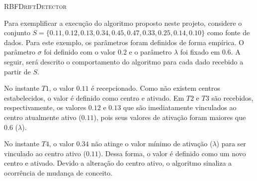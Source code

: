 \documentclass[qual, classic, a4paper]{ufbathesis}
\begin{document}
\vspace{7pt}
\begin{algorithm}[H]
    \SetAlgoLined

    \caption{\textsc{RBFDriftDetector}}
    \label{alg:algoritmo} 
\end{algorithm}
\vspace{7pt}

Para exemplificar a execução do algoritmo proposto neste projeto, considere o conjunto $S = \{0.11, 0.12, 0.13, 0.34, 0.45, 0.47, 0.33, 0.25, 0.14, 0.10\}$ como fonte de dados.
Para este exemplo, os parâmetros foram definidos de forma empírica. O parâmetro \textit{$\sigma$} foi definido com o valor $0.2$ e o parâmetro \textit{$\lambda$} foi fixado em $0.6$.
A seguir, será descrito o comportamento do algoritmo para cada dado recebido a partir de $S$.

No instante $T1$, o valor $0.11$ é recepcionado. Como não existem centros estabelecidos, o valor é definido como centro e ativado.
Em $T2$ e $T3$ são recebidos, respectivamente, os valores $0.12$ e $0.13$ que são imediatamente vinculados ao centro atualmente ativo ($0.11$), pois seus valores de ativação foram maiores que $0.6$ ($\lambda$).

No instante $T4$, o valor $0.34$ não atinge o valor mínimo de ativação (\textit{$\lambda$}) para ser vinculado ao centro ativo ($0.11$). 
Dessa forma, o valor é definido como um novo centro e ativado.
Devido a alteração do centro ativo, o algoritmo sinaliza a ocorrência de mudança de conceito.
\end{document}
